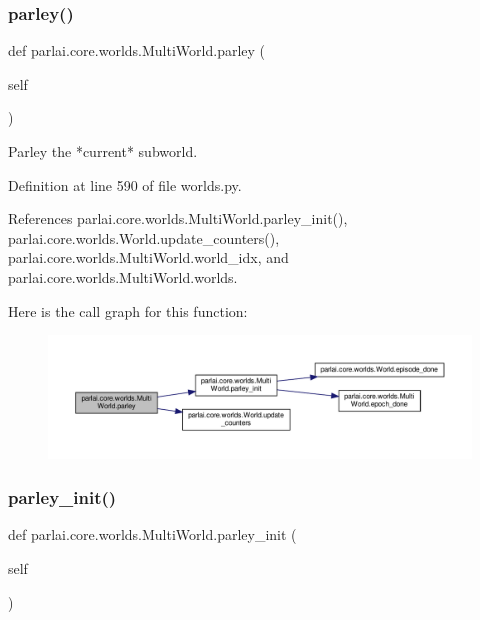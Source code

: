 \subsubsection{\texorpdfstring{parley()}{parley()}}
{\footnotesize\ttfamily def parlai.\+core.\+worlds.\+Multi\+World.\+parley (\begin{DoxyParamCaption}\item[{}]{self }\end{DoxyParamCaption})}

\begin{DoxyVerb}Parley the *current* subworld.\end{DoxyVerb}
 

Definition at line 590 of file worlds.\+py.



References parlai.\+core.\+worlds.\+Multi\+World.\+parley\+\_\+init(), parlai.\+core.\+worlds.\+World.\+update\+\_\+counters(), parlai.\+core.\+worlds.\+Multi\+World.\+world\+\_\+idx, and parlai.\+core.\+worlds.\+Multi\+World.\+worlds.

Here is the call graph for this function\+:
\nopagebreak
\begin{figure}[H]
\begin{center}
\leavevmode
\includegraphics[width=350pt]{classparlai_1_1core_1_1worlds_1_1MultiWorld_aae71b8182e17a1579352a52b56614b64_cgraph}
\end{center}
\end{figure}
\mbox{\label{classparlai_1_1core_1_1worlds_1_1MultiWorld_a9f2f4de7791e3b295359039e9d26a523}} 
\subsubsection{\texorpdfstring{parley\+\_\+init()}{parley\_init()}}
{\footnotesize\ttfamily def parlai.\+core.\+worlds.\+Multi\+World.\+parley\+\_\+init (\begin{DoxyParamCaption}\item[{}]{self }\end{DoxyParamCaption})}

